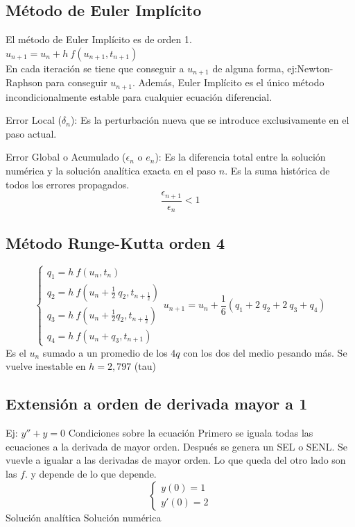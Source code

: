\subsection{Método de Euler Implícito}
El método de Euler Implícito es de orden 1.\\
$u_{n+1}=u_n+h\ f(u_{n+1}, t_{n+1})$\\
En cada iteración se tiene que conseguir a $u_{n+1}$ de alguna forma, ej:Newton-Raphson para conseguir $u_{n+1}$.
Además, Euler Implícito es el único método incondicionalmente estable para cualquier ecuación diferencial.

Error Local ($\delta_n$): Es la perturbación nueva que se introduce exclusivamente en el paso actual.


Error Global o Acumulado ($\epsilon_n$ o $e_n$): Es la diferencia total entre la solución numérica y la solución analítica exacta en el paso $n$. Es la suma histórica de todos los errores propagados.
\begin{equation}
    \frac{\epsilon_{n+1}}{\epsilon_n}<1
\end{equation}

\subsection{Método Runge-Kutta orden 4}
\begin{equation}
    \begin{cases}
        q_1=h\ f(u_n, t_n) \\
        q_2=h\ f(u_n+\frac{1}{2}\ q_2, t_{n+\frac{1}{2}}) \\
        q_3=h\ f(u_n+\frac{1}{2}q_2, t_{n+\frac{1}{2}}) \\
        q_4=h\ f(u_n+q_3, t_{n+1})
    \end{cases}
u_{n+1}=u_n+\frac{1}{6}(q_1+2\ q_2+2\ q_3+q_4)
\end{equation}
Es el $u_n$ sumado a un promedio de los $4 q$ con los dos del medio pesando más.
Se vuelve inestable en $h = 2,797$ (tau)

\subsection{Extensión a orden de derivada mayor a 1}
Ej: $y''+y=0$
Condiciones sobre la ecuación
Primero se iguala todas las ecuaciones a la derivada de mayor orden.
Después se genera un SEL o SENL. Se vuevle a igualar a las derivadas de mayor orden. Lo que queda del otro lado son las $f$.
y depende de lo que depende.
\begin{equation}
    \begin{cases}
        y(0)=1\\
        y'(0)=2
    \end{cases}
\end{equation}
    Solución analítica  Solución numérica

